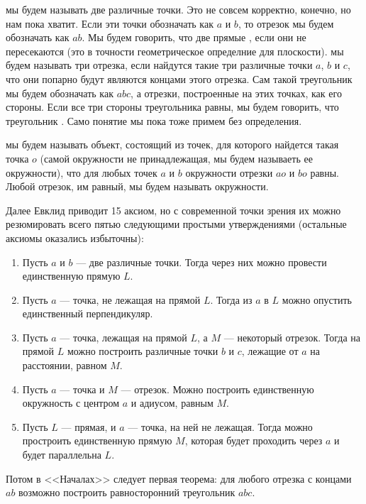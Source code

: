  мы будем называть две различные точки. Это не совсем корректно, конечно, но нам пока хватит. Если эти точки обозначать как $a$ и $b$, то отрезок мы будем обозначать как $ab$. Мы будем говорить, что две прямые , если они не пересекаются (это в точности геометрическое определние для плоскости).  мы будем называть три отрезка, если найдутся такие три различные точки $a$, $b$ и $c$, что они попарно будут являются концами этого отрезка. Сам такой треугольник мы будем обозначать как $abc$, а отрезки, построенные на этих точках, как его стороны. Если все три стороны треугольника равны, мы будем говорить, что треугольник . Само понятие  мы пока тоже примем без определения.

 мы будем называть объект, состоящий из точек, для которого найдется такая точка $o$ (самой окружности не принадлежащая, мы будем называеть ее  окружности), что для любых точек $a$ и $b$ окружности отрезки $ao$ и $bo$ равны. Любой отрезок, им равный, мы будем называть  окружности.

Далее Евклид приводит 15 аксиом, но с современной точки зрения их можно резюмировать всего пятью следующими простыми утверждениями (остальные аксиомы оказались избыточны):

\begin{enumerate}
\item Пусть $a$ и $b$ --- две различные точки. Тогда через них можно провести единственную прямую $L$.
\item Пусть $a$ --- точка, не лежащая на прямой $L$. Тогда из $a$ в $L$ можно опустить единственный перпендикуляр.
\item Пусть $a$ --- точка, лежащая на прямой $L$, а $M$ --- некоторый отрезок. Тогда на прямой $L$ можно построить различные точки $b$ и $c$, лежащие от $a$ на расстоянии, равном $M$.
\item Пусть $a$ --- точка и $M$ --- отрезок. Можно построить единственную окружность с центром $a$ и адиусом, равным $M$.
\item Пусть $L$ --- прямая, и $a$ --- точка, на ней не лежащая. Тогда можно простроить единственную прямую $M$, которая будет проходить через $a$ и будет параллельна $L$.
\end{enumerate}

Потом в <<Началах>> следует первая теорема: для любого отрезка с концами $ab$ возможно построить равносторонний треугольник $abc$.

